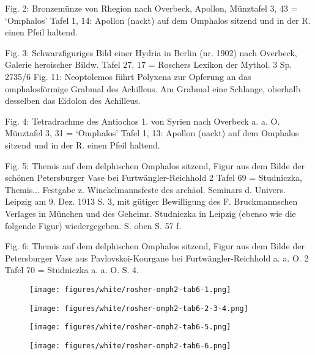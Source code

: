 \documentclass[a4paper, 11pt, oneside]{article}
\begin{document}
Fig. 2: Bronzemünze von Rhegion nach Overbeck, Apollon, Münztafel 3, 43 = `Omphalos' Tafel 1, 14: Apollon (nackt) auf dem Omphalos sitzend und in der R. einen Pfeil haltend.

Fig. 3: Schwarzfiguriges Bild einer Hydria in Berlin (nr. 1902) nach Overbeck, Galerie heroischer Bildw. Tafel 27, 17 = Roschers Lexikon der Mythol. 3 Sp. 2735/6 Fig. 11: Neoptolemos führt Polyxena zur Opferung an das omphalosförmige Grabmal des Achilleus. Am Grabmal eine Schlange, oberhalb desselben das Eidolon des Achilleus.

Fig. 4: Tetradrachme des Antiochos 1. von Syrien nach Overbeck a. a. O. Münztafel 3, 31 = `Omphalos' Tafel 1, 13: Apollon (nackt) auf dem Omphalos sitzend und in der R. einen Pfeil haltend.

Fig. 5: Themis auf dem delphischen Omphalos sitzend, Figur aus dem Bilde der schönen Petersburger Vase bei Furtwängler-Reichhold 2 Tafel 69 = Studniczka, Themis... Festgabe z. Winckelmannsfeste des archäol. Seminars d. Univers. Leipzig am 9. Dez. 1913 S. 3, mit gütiger Bewilligung des F. Bruckmannschen Verlages in München und des Geheimr. Studniczka in Leipzig (ebenso wie die folgende Figur) wiedergegeben. S. oben S. 57 f.

Fig. 6: Themis auf dem delphischen Omphalos sitzend, Figur aus dem Bilde der Petersburger Vase aus Pavlovskoi-Kourgane bei Furtwängler-Reichhold a. a. O. 2 Tafel 70 = Studniczka a. a. O. S. 4.
\clearpage
\begin{landscape}
\vspace*{\fill}
\begin{figure}[H]
\centering
\texttt{[image: figures/white/rosher-omph2-tab6-1.png]}
\caption{}
\end{figure}
\vspace*{\fill}
\clearpage
\vspace*{\fill}
\begin{figure}[H]
\centering
\texttt{[image: figures/white/rosher-omph2-tab6-2-3-4.png]}
\caption{}
\end{figure}
\vspace*{\fill}
\clearpage
\end{landscape}
\vspace*{\fill}
\begin{figure}[H]
\centering
\texttt{[image: figures/white/rosher-omph2-tab6-5.png]}
\caption{}
\end{figure}
\vspace*{\fill}
\clearpage
\vspace*{\fill}
\begin{figure}[H]
\centering
\texttt{[image: figures/white/rosher-omph2-tab6-6.png]}
\caption{}
\end{figure}
\vspace*{\fill}
\clearpage
\end{document}
